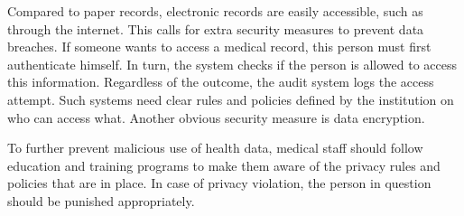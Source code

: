     Compared to paper records, electronic records are easily accessible, such as through the internet. This calls for extra security measures to prevent data breaches. If someone wants to access a medical record, this person must first authenticate himself. In turn, the system checks if the person is allowed to access this information. Regardless of the outcome, the audit system logs the access attempt. Such systems need clear rules and policies defined by the institution on who can access what. Another obvious security measure is data encryption.

    To further prevent malicious use of health data, medical staff should follow education and training programs to make them aware of the privacy rules and policies that are in place. In case of privacy violation, the person in question should be punished appropriately.